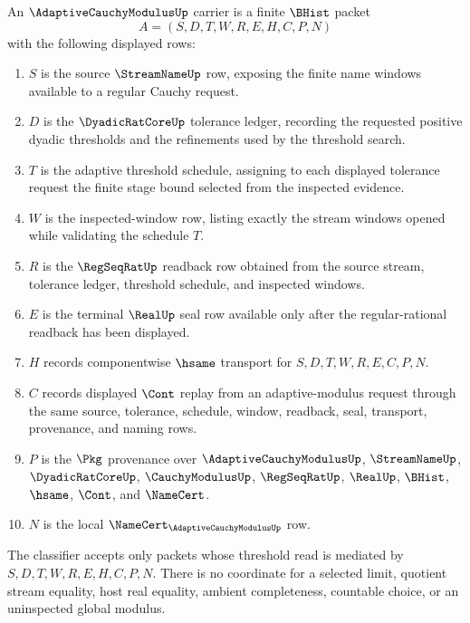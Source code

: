 \begin{definition}
\label{def:adaptive-cauchy-modulus-carrier}
An $\AdaptiveCauchyModulusUp$ carrier is a finite $\BHist$ packet
$$
A=(S,D,T,W,R,E,H,C,P,N)
$$
with the following displayed rows:
\begin{enumerate}
\item $S$ is the source $\StreamNameUp$ row, exposing the finite name windows available to a regular Cauchy request.
\item $D$ is the $\DyadicRatCoreUp$ tolerance ledger, recording the requested positive dyadic thresholds and the refinements used by the threshold search.
\item $T$ is the adaptive threshold schedule, assigning to each displayed tolerance request the finite stage bound selected from the inspected evidence.
\item $W$ is the inspected-window row, listing exactly the stream windows opened while validating the schedule $T$.
\item $R$ is the $\RegSeqRatUp$ readback row obtained from the source stream, tolerance ledger, threshold schedule, and inspected windows.
\item $E$ is the terminal $\RealUp$ seal row available only after the regular-rational readback has been displayed.
\item $H$ records componentwise $\hsame$ transport for $S,D,T,W,R,E,C,P,N$.
\item $C$ records displayed $\Cont$ replay from an adaptive-modulus request through the same source, tolerance, schedule, window, readback, seal, transport, provenance, and naming rows.
\item $P$ is the $\Pkg$ provenance over $\AdaptiveCauchyModulusUp$, $\StreamNameUp$, $\DyadicRatCoreUp$, $\CauchyModulusUp$, $\RegSeqRatUp$, $\RealUp$, $\BHist$, $\hsame$, $\Cont$, and $\NameCert$.
\item $N$ is the local $\NameCert_{\AdaptiveCauchyModulusUp}$ row.
\end{enumerate}
The classifier accepts only packets whose threshold read is mediated by $S,D,T,W,R,E,H,C,P,N$. There is no coordinate for a selected limit, quotient stream equality, host real equality, ambient completeness, countable choice, or an uninspected global modulus.
\end{definition}

